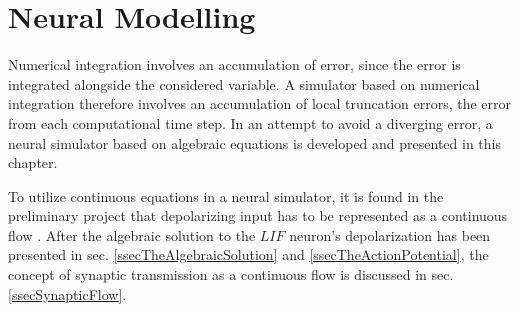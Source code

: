 \documentclass[b5paper,12 pt]{report}
\begin{document}
	
	



\chapter{Neural Modelling}
	\label{chDevelopmentOfANovelModel}

	Numerical integration involves an accumulation of error, since the error is integrated alongside the considered variable.
	A simulator based on numerical integration therefore involves an accumulation of local truncation errors, the error from each computational time step.
	In an attempt to avoid a diverging error, a neural simulator based on algebraic equations is developed and presented in this chapter.

	To utilize continuous equations in a neural simulator, it is found in the preliminary project that depolarizing input has to be represented as a continuous flow \cite{FDP_report}.
	After the algebraic solution to the $LIF$ neuron's depolarization has been presented in sec. \ref{ssecTheAlgebraicSolution} and \ref{ssecTheActionPotential},
		the concept of synaptic transmission as a continuous flow is discussed in sec. \ref{ssecSynapticFlow}.
\end{document}

